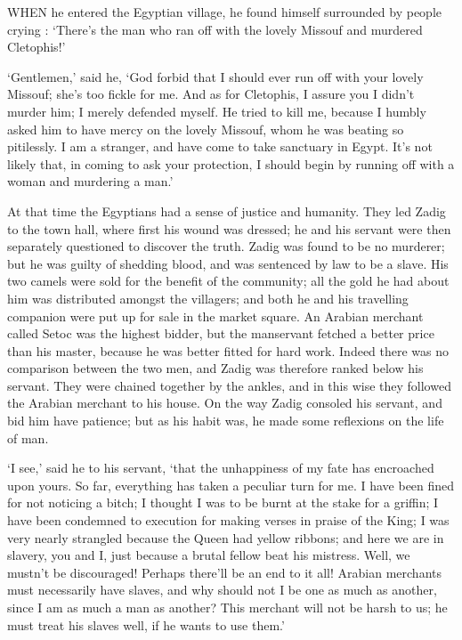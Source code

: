 \documentclass{article}
\begin{document}
\begin{center}
 

WHEN he entered the Egyptian village, he found himself surrounded by people crying 
: `There's the man who ran off with the lovely Missouf and murdered Cletophis!' 

`Gentlemen,' said he, `God forbid that I should ever run off with your lovely Missouf; 
she's too fickle for me. And as for Cletophis, I assure you I didn't murder him; 
I merely defended myself. He tried to kill me, because I humbly asked him to have 
mercy on the lovely Missouf, whom he was beating so pitilessly. I am a stranger, 
and have come to take sanctuary in Egypt. It's not likely that, in coming to ask 
your protection, I should begin by running off with a woman and murdering a man.' 

At that time the Egyptians had a sense of justice and humanity. They led Zadig 
to the town hall, where first his wound was dressed; he and his servant were then 
separately questioned to discover the truth. Zadig was found to be no murderer; 
but he was guilty of shedding blood, and was sentenced by law to be a slave. His 
two camels were sold for the benefit of the community; all the gold he had about 
him was distributed amongst the villagers; and both he and his travelling companion 
were put up for sale in the market square. An Arabian merchant called Setoc was 
the highest bidder, but the manservant fetched a better price than his master, 
because he was better fitted for hard work. Indeed there was no comparison between 
the two men, and Zadig was therefore ranked below his servant. They were chained 
together by the ankles, and in this wise they followed the Arabian merchant to 
his house. On the way Zadig consoled his servant, and bid him have patience; but 
as his habit was, he made some reflexions on the life of man. 

`I see,' said he to his servant, `that the unhappiness of my fate has encroached 
upon yours. So far, everything has taken a peculiar turn for me. I have been fined 
for not noticing a bitch; I thought I was to be burnt at the stake for a griffin; 
I have been condemned to execution for making verses in praise of the King; I was 
very nearly strangled because the Queen had yellow ribbons; and here we are in 
slavery, you and I, just because a brutal fellow beat his mistress. Well, we mustn't 
be discouraged! Perhaps there'll be an end to it all! Arabian merchants must necessarily 
have slaves, and why should not I be one as much as another, since I am as much 
a man as another? This merchant will not be harsh to us; he must treat his slaves 
well, if he wants to use them.' 


\end{center}
\end{document}

